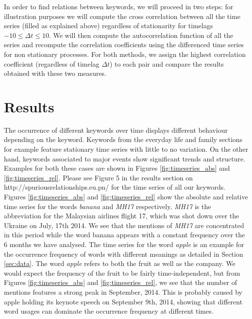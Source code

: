 \documentclass[12pt, a4paper]{article}
\begin{document}
In order to find relations between keywords, we will proceed in two steps: for illustration purposes we will compute the cross correlation between all the time series (filled as explained above) regardless of stationarity for timelags $-10 \leq \Delta t \leq 10$. We will then compute the autocorrelation function of all the series and recompute the correlation coefficients using the differenced time series for non stationary processes. For both methods, we assign the highest correlation coefficient (regardless of timelag $\Delta t$) to each pair and compare the results obtained with these two measures. 

\section{Results}
The occurrence of different keywords over time displays different behaviour depending on the keyword. Keywords from the everyday life and family sections for example feature stationary time series with little to no variation. On the other hand, keywords associated to major events show significant trends and structure. Examples for both these cases are shown in Figures \ref{fig:timeseries_abs} and \ref{fig:timeseries_rel}. Please see Figure 5 in the results section on http://spuriousrelationships.eu.pn/ for the time series of all our keywords. Figures \ref{fig:timeseries_abs} and \ref{fig:timeseries_rel} show the absolute and relative time series for the words \textit{banana} and \textit{MH17} respectively. \textit{MH17} is the abbreviation for the Malaysian airlines flight 17, which was shot down over the Ukraine on July, 17th 2014. We see that the mentions of \textit{MH17} are concentrated in this period while the word banana appears with a constant frequency over the 6 months we have analysed. The time series for the word \textit{apple} is an example for the occurrence frequency of words with different meanings as detailed in Section \ref{sec:data}. The word \textit{apple} refers to both the fruit as well as the company. We would expect the frequency of the fruit to be fairly time-independent, but from Figures \ref{fig:timeseries_abs} and \ref{fig:timeseries_rel}, we see that the number of mentions features a strong peak in September, 2014. This is probably caused by apple holding its keynote speech on September 9th, 2014, showing that different word usages can dominate the occurrence frequency at different times.
\end{document}
